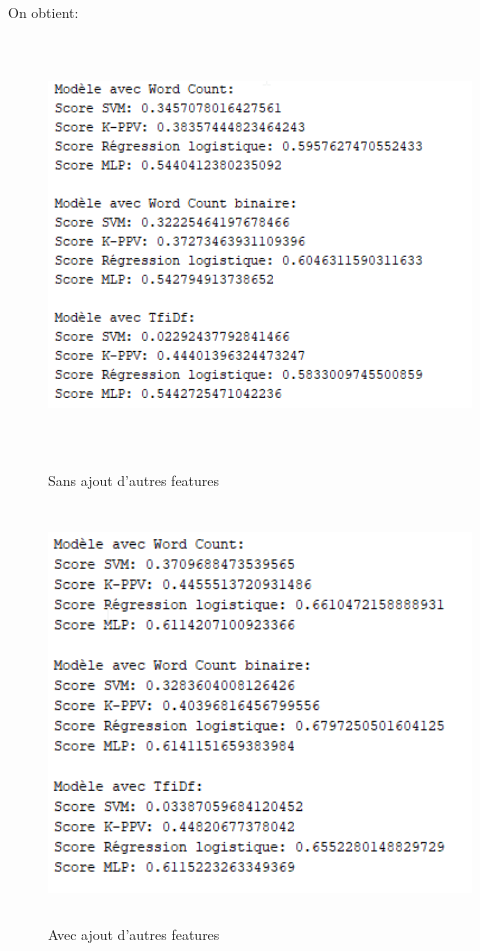 \documentclass[12pt,french]{article}
\begin{document}
On obtient:

\begin{figure}[h!] %
	\begin{minipage}[b]{0.45\textwidth}
		\includegraphics[width=\textwidth,height=11cm]{analyse_rapide_sans_features}	
		\caption*{Sans ajout d'autres features}
	\end{minipage}
	\hfill
	\begin{minipage}[b]{0.45\textwidth}
		\includegraphics[width=\textwidth,height=11cm]{analyse_rapide_avec_features}
		\caption*{Avec ajout d'autres features}
	\end{minipage}
\end{figure}
\clearpage
\end{document}

